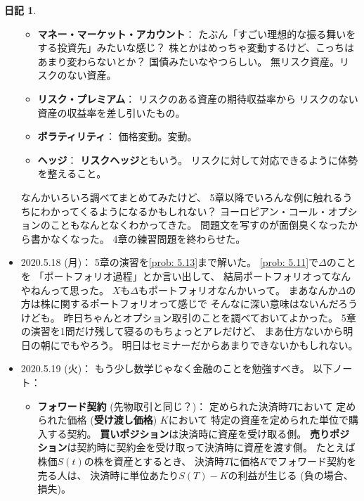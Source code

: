 \documentclass[uplatex]{jsarticle}
\theoremstyle{definition}
\newtheorem*{nikki*}{日記}
\begin{document}
\begin{nikki*}
\begin{itemize}
\begin{itemize}
      \item
      \textbf{マネー・マーケット・アカウント}：
      たぶん「すごい理想的な振る舞いをする投資先」みたいな感じ？
      株とかはめっちゃ変動するけど、こっちはあまり変わらないとか？
      国債みたいなやつらしい。
      無リスク資産。リスクのない資産。
      \item
      \textbf{リスク・プレミアム}：
      リスクのある資産の期待収益率から
      リスクのない資産の収益率を差し引いたもの。
      \item
      \textbf{ボラティリティ}：
      価格変動。変動。
      \item
      \textbf{ヘッジ}：
      \textbf{リスクヘッジ}ともいう。
      リスクに対して対応できるように体勢を整えること。
    \end{itemize}
    なんかいろいろ調べてまとめてみたけど、
    5章以降でいろんな例に触れるうちにわかってくるようになるかもしれない？
    ヨーロピアン・コール・オプションのこともなんとなくわかってきた。
    問題文を写すのが面倒臭くなったから書かなくなった。
    4章の練習問題を終わらせた。
    \item
    2020.5.18 (月)：
    5章の演習を\autoref{prob: 5.13}まで解いた。
    \autoref{prob: 5.11}で\(\Delta\)のことを
    「ポートフォリオ過程」とか言い出して、
    結局ポートフォリオってなんやねんって思った。
    \(X\)も\(\Delta\)もポートフォリオなんかいって。
    まあなんか\(\Delta\)の方は株に関するポートフォリオって感じで
    そんなに深い意味はないんだろうけども。
    昨日ちゃんとオプション取引のことを調べておいてよかった。
    5章の演習を1問だけ残して寝るのもちょっとアレだけど、
    まあ仕方ないから明日の朝にでもやろう。
    明日はセミナーだからあまりできないかもしれない。
    \item
    2020.5.19 (火)：
    もう少し数学じゃなく金融のことを勉強すべき。
    以下ノート：
    \begin{itemize}
      \item
      \textbf{フォワード契約} (先物取引と同じ？)：
      定められた決済時\(T\)において
      定められた価格 (\textbf{受け渡し価格}) \(K\)において
      特定の資産を定められた単位で購入する契約。
      \textbf{買いポジション}は決済時に資産を受け取る側。
      \textbf{売りポジション}は契約時に契約金を受け取って決済時に資産を渡す側。
      たとえば株価\(S(t)\)の株を資産とするとき、
      決済時\(T\)に価格\(K\)でフォワード契約を売る人は、
      決済時に単位あたり\(S(T)-K\)の利益が生じる (負の場合、損失)。


\end{itemize}
\end{itemize}
\end{nikki*}
\end{document}
